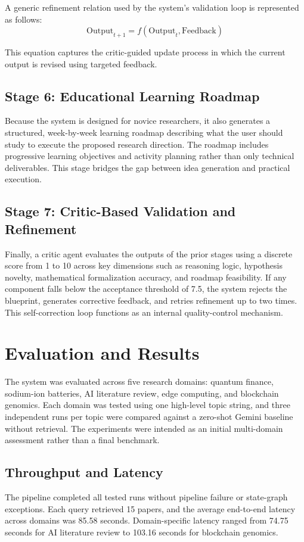 \documentclass[conference]{IEEEtran}
\begin{document}
A generic refinement relation used by the system's validation loop is represented as follows:
\begin{equation}
\text{Output}_{t+1} = f(\text{Output}_t, \text{Feedback})
\label{eq:refinement}
\end{equation}

This equation captures the critic-guided update process in which the current output is revised using targeted feedback.

\subsection{Stage 6: Educational Learning Roadmap}
Because the system is designed for novice researchers, it also generates a structured, week-by-week learning roadmap describing what the user should study to execute the proposed research direction. The roadmap includes progressive learning objectives and activity planning rather than only technical deliverables. This stage bridges the gap between idea generation and practical execution.

\subsection{Stage 7: Critic-Based Validation and Refinement}
Finally, a critic agent evaluates the outputs of the prior stages using a discrete score from 1 to 10 across key dimensions such as reasoning logic, hypothesis novelty, mathematical formalization accuracy, and roadmap feasibility. If any component falls below the acceptance threshold of 7.5, the system rejects the blueprint, generates corrective feedback, and retries refinement up to two times. This self-correction loop functions as an internal quality-control mechanism.

\section{Evaluation and Results}
The system was evaluated across five research domains: quantum finance, sodium-ion batteries, AI literature review, edge computing, and blockchain genomics. Each domain was tested using one high-level topic string, and three independent runs per topic were compared against a zero-shot Gemini baseline without retrieval. The experiments were intended as an initial multi-domain assessment rather than a final benchmark.

\subsection{Throughput and Latency}
The pipeline completed all tested runs without pipeline failure or state-graph exceptions. Each query retrieved 15 papers, and the average end-to-end latency across domains was 85.58 seconds. Domain-specific latency ranged from 74.75 seconds for AI literature review to 103.16 seconds for blockchain genomics.
\end{document}
